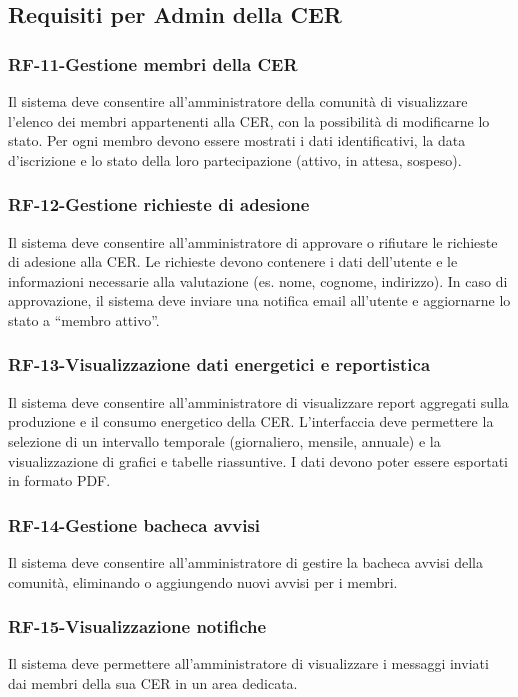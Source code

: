 \subsection{Requisiti per Admin della CER}
\subsubsection*{RF-11-Gestione membri della CER}
Il sistema deve consentire all’amministratore della comunità di visualizzare l’elenco dei membri appartenenti alla CER, con la possibilità di modificarne lo stato. Per ogni membro devono essere mostrati i dati identificativi, la data d'iscrizione e lo stato della loro partecipazione (attivo, in attesa, sospeso).
\subsubsection*{RF-12-Gestione richieste di adesione}
Il sistema deve consentire all’amministratore di approvare o rifiutare le richieste di adesione alla CER. Le richieste devono contenere i dati dell’utente e le informazioni necessarie alla valutazione (es. nome, cognome, indirizzo). In caso di approvazione, il sistema deve inviare una notifica email all’utente e aggiornarne lo stato a “membro attivo”.
\subsubsection*{RF-13-Visualizzazione dati energetici e reportistica}
Il sistema deve consentire all’amministratore di visualizzare report aggregati sulla produzione e il consumo energetico della CER. L’interfaccia deve permettere la selezione di un intervallo temporale (giornaliero, mensile, annuale) e la visualizzazione di grafici e tabelle riassuntive. I dati devono poter essere esportati in formato PDF.
\subsubsection*{RF-14-Gestione bacheca avvisi}
Il sistema deve consentire all'amministratore di gestire la bacheca avvisi della comunità, eliminando o aggiungendo nuovi avvisi per i membri.
\subsubsection*{RF-15-Visualizzazione notifiche}
Il sistema deve permettere all'amministratore di visualizzare i messaggi inviati dai membri della sua CER in un area dedicata.







